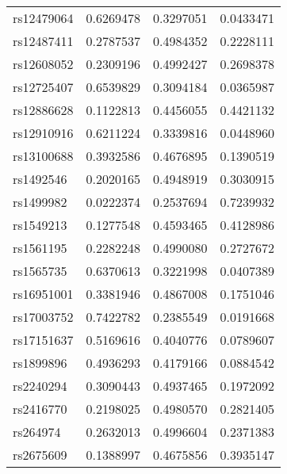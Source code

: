 \documentclass[
]{article}
\theoremstyle{plain}
\begin{document}
{\begin{table}[H]
\begin{minipage}{0.5\linewidth}
\begin{table}[H]
\begin{tabular}{lrrr}
rs12479064 & 0.6269478 & 0.3297051 & 0.0433471\\
rs12487411 & 0.2787537 & 0.4984352 & 0.2228111\\
rs12608052 & 0.2309196 & 0.4992427 & 0.2698378\\
\addlinespace
rs12725407 & 0.6539829 & 0.3094184 & 0.0365987\\
rs12886628 & 0.1122813 & 0.4456055 & 0.4421132\\
rs12910916 & 0.6211224 & 0.3339816 & 0.0448960\\
rs13100688 & 0.3932586 & 0.4676895 & 0.1390519\\
rs1492546 & 0.2020165 & 0.4948919 & 0.3030915\\
\addlinespace
rs1499982 & 0.0222374 & 0.2537694 & 0.7239932\\
rs1549213 & 0.1277548 & 0.4593465 & 0.4128986\\
rs1561195 & 0.2282248 & 0.4990080 & 0.2727672\\
rs1565735 & 0.6370613 & 0.3221998 & 0.0407389\\
rs16951001 & 0.3381946 & 0.4867008 & 0.1751046\\
\addlinespace
rs17003752 & 0.7422782 & 0.2385549 & 0.0191668\\
rs17151637 & 0.5169616 & 0.4040776 & 0.0789607\\
rs1899896 & 0.4936293 & 0.4179166 & 0.0884542\\
rs2240294 & 0.3090443 & 0.4937465 & 0.1972092\\
rs2416770 & 0.2198025 & 0.4980570 & 0.2821405\\
\addlinespace
rs264974 & 0.2632013 & 0.4996604 & 0.2371383\\
rs2675609 & 0.1388997 & 0.4675856 & 0.3935147\\
\bottomrule
\end{tabular}
\end{table}



\end{minipage}
\end{table}}
\end{document}
